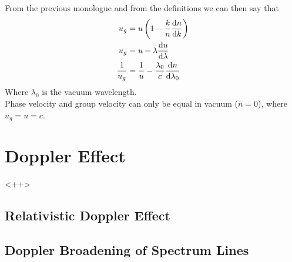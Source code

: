 \documentclass[../electromagnetism.tex]{subfiles}
\begin{document}
From the previous monologue and from the definitions we can then say that
\begin{equation}
	\begin{aligned}
		u_g&=u\left( 1-\frac{k}{n}\dv{n}{k} \right)\\
		u_g&=u-\lambda\dv{u}{\lambda}\\
		\frac{1}{u_g}&=\frac{1}{u}-\frac{\lambda_0}{c}\dv{n}{\lambda_0}
	\end{aligned}
	\label{eq:groupvelder}
\end{equation}
Where $\lambda_0$ is the vacuum wavelength.\\
Phase velocity and group velocity can only be equal in vacuum ($n=0$), where $u_g=u=c$.
\section{Doppler Effect}
<++>
\subsection{Relativistic Doppler Effect}
\subsection{Doppler Broadening of Spectrum Lines}
\end{document}
